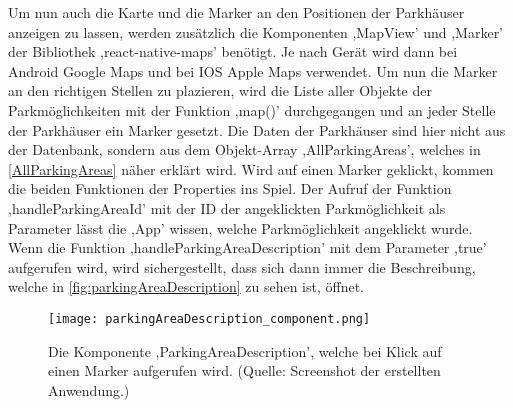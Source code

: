 Um nun auch die Karte und die Marker an den Positionen der Parkhäuser anzeigen zu lassen, werden zusätzlich die Komponenten ,MapView' und ,Marker' der Bibliothek ,react-native-maps' benötigt. Je nach Gerät wird dann bei Android Google Maps und bei IOS Apple Maps verwendet. Um nun die Marker an den richtigen Stellen zu plazieren, wird die Liste aller Objekte der Parkmöglichkeiten mit der Funktion ,map()' durchgegangen und an jeder Stelle der Parkhäuser ein Marker gesetzt. Die Daten der Parkhäuser sind hier nicht aus der Datenbank, sondern aus dem Objekt-Array ,AllParkingAreas', welches in \autoref{AllParkingAreas} näher erklärt wird. Wird auf einen Marker geklickt, kommen die beiden Funktionen der Properties ins Spiel. Der Aufruf der Funktion ,handleParkingAreaId' mit der ID der angeklickten Parkmöglichkeit als Parameter lässt die ,App' wissen, welche Parkmöglichkeit angeklickt wurde. Wenn die Funktion ,handleParkingAreaDescription' mit dem Parameter ,true' aufgerufen wird, wird sichergestellt, dass sich dann immer die Beschreibung, welche in \autoref{fig:parkingAreaDescription} zu sehen ist, öffnet.

\begin{figure}[h!]
	\centering
	\texttt{[image: parkingAreaDescription\_component.png]}
	\caption[Die Komponente ,ParkingAreaDescription', welche bei Klick auf einen Marker aufgerufen wird.]
	{Die Komponente ,ParkingAreaDescription', welche bei Klick auf einen Marker aufgerufen wird. (Quelle: Screenshot der erstellten Anwendung.)}
	\label{fig:parkingAreaDescription}
\end{figure}

